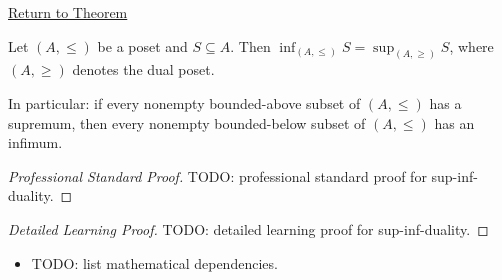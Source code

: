 \newpage
{}
\label{prf:sup-inf-duality}

\begin{remark*}[Return]
\hyperref[prop:sup-inf-duality]{Return to Theorem}
\end{remark*}

\begin{theorem*}
Let $(A, \leq)$ be a poset and $S \subseteq A$.  Then
$\inf_{(A,\leq)} S = \sup_{(A,\geq)} S$,
where $(A,\geq)$ denotes the dual poset.

In particular: if every nonempty bounded-above subset of $(A,\leq)$ has a
supremum, then every nonempty bounded-below subset of $(A,\leq)$ has an
infimum.
\end{theorem*}

\begin{proof}[Professional Standard Proof]
\LRAProofBodyStart
TODO: professional standard proof for sup-inf-duality.
\end{proof}

\begin{proof}[Detailed Learning Proof]
\LRAProofBodyStart
TODO: detailed learning proof for sup-inf-duality.
\end{proof}

\begin{remark*}
\end{remark*}

\begin{dependencies}
\begin{itemize}
  \item TODO: list mathematical dependencies.
\end{itemize}
\end{dependencies}

\clearpage
